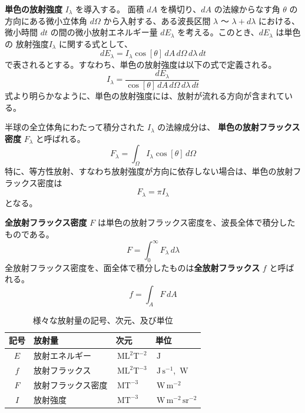 \documentclass[article,twoside]{dennou777}
\newcommand{\hmunit}[1]{\,\mathrm{#1}}
\newcommand{\hmemph}[1]{\textbf{#1}}
\begin{document}
\hmemph{単色の放射強度} $I_\lambda$ を導入する。
面積 $dA$ を横切り、$dA$ の法線からなす角 $\theta$ の方向にある微小立体角 $d\Omega$
から入射する、ある波長区間 $\lambda$ 〜 $\lambda+d\lambda$ における、微小時間 $dt$
の間の微小放射エネルギー量 $dE_\lambda$ を考える。このとき、$dE_\lambda$ は単色の
放射強度$I_\lambda$ に関する式として、
\begin{equation}
	dE_\lambda=I_\lambda\cos[\theta]\,dA\,d\Omega\,d\lambda\,dt
\end{equation}
で表されるとする。すなわち、単色の放射強度は以下の式で定義される。
\begin{equation}
	I_\lambda=\frac{dE_\lambda}{\cos[\theta]\,dA\,d\Omega\,d\lambda\,dt}
\end{equation}
式より明らかなように、単色の放射強度には、放射が流れる方向が含まれている。

半球の全立体角にわたって積分された $I_\lambda$ の法線成分は、
\hmemph{単色の放射フラックス密度} $F_\lambda$ と呼ばれる。
\begin{equation}
	F_\lambda=\int_\Omega I_\lambda\cos[\theta]\,d\Omega
\end{equation}
特に、等方性放射、すなわち放射強度が方向に依存しない場合は、単色の放射フラックス密度は
\begin{equation}
	F_\lambda=\pi I_\lambda
\end{equation}
となる。

\hmemph{全放射フラックス密度} $F$ は単色の放射フラックス密度を、波長全体で積分したものである。
\begin{equation}
	F=\int^\infty_0 F_\lambda\,d\lambda
\end{equation}
全放射フラックス密度を、面全体で積分したものは\hmemph{全放射フラックス} $f$ と呼ばれる。
\begin{equation}
	f=\int_AF\,dA
\end{equation}

\begin{table}[t]
	\caption{様々な放射量の記号、次元、及び単位}
	\centering
	\begin{tabular}{clll}
		\hline
		記号&放射量&次元&単位\\
		\hline\hline
		$E$&放射エネルギー&$\hmunit{ML^2T^{-2}}$&$\hmunit{J}$\\
		$f$&放射フラックス&$\hmunit{ML^2T^{-3}}$&$\hmunit{J\,s^{-1}}$, $\hmunit{W}$\\
		$F$&放射フラックス密度&$\hmunit{MT^{-3}}$&$\hmunit{W\,m^{-2}}$\\
		$I$&放射強度&$\hmunit{MT^{-3}}$&$\hmunit{W\,m^{-2}\,sr^{-2}}$\\
		\hline
	\end{tabular}
\end{table}
\end{document}
